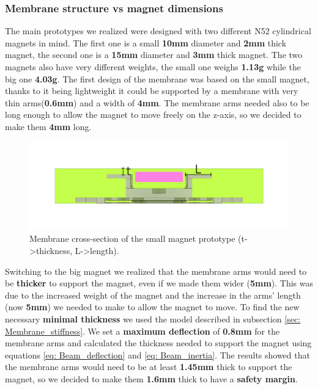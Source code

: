 \subsubsection{Membrane structure vs magnet dimensions}
The main prototypes we realized were designed with two different N52 cylindrical magnets in mind.
The first one is a small \textbf{10mm} diameter and \textbf{2mm} thick magnet, the second one is a \textbf{15mm} diameter and \textbf{3mm} thick magnet.
The two magnets also have very different weights, the small one weighs \textbf{1.13g} while the big one \textbf{4.03g}.
The first design of the membrane was based on the small magnet, thanks to it being lightweight it could be supported by a membrane with very thin arms(\textbf{0.6mm}) and a width of \textbf{4mm}.
The membrane arms needed also to be long enough to allow the magnet to move freely on the z-axis, so we decided to make them \textbf{4mm} long.
\begin{figure}[H]
    \centering
    \includegraphics[width = 0.9\linewidth]{Chapters/Chapter5/Flexible_Mat_Prototypes/Figures/membrane_v1_section.png}
    \caption[Small prototype membrane cross-section]{Membrane cross-section of the small magnet prototype (t->thickness, L->length).}
    \label{fig: Membrane_v1_section}
\end{figure}

Switching to the big magnet we realized that the membrane arms would need to be \textbf{thicker} to support the magnet, even if we made them wider (\textbf{5mm}).
This was due to the increased weight of the magnet and the increase in the arms' length (now \textbf{5mm}) we needed to make to allow the magnet to move.
To find the new necessary \textbf{minimal thickness} we used the model described in subsection \ref{sec: Membrane_stiffness}.
We set a \textbf{maximum deflection} of \textbf{0.8mm} for the membrane arms and calculated the thickness needed to support the magnet using equations \ref{eq: Beam_deflection} and \ref{eq: Beam_inertia}.
The results showed that the membrane arms would need to be at least \textbf{1.45mm} thick to support the magnet, so we decided to make them \textbf{1.6mm} thick to have a \textbf{safety margin}.

